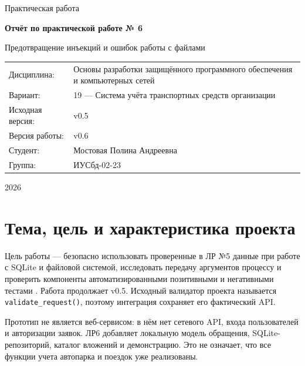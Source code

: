 \documentclass[12pt,a4paper]{article}
\begin{document}
\begin{titlepage}
\centering
{\large Практическая работа\par}
\vspace{2.2cm}
{\LARGE\bfseries Отчёт по практической работе № 6\par}
\vspace{0.6cm}
{\Large Предотвращение инъекций и ошибок работы с файлами\par}
\vspace{1.8cm}
\begin{tabular}{p{4cm}p{11cm}}
Дисциплина: & Основы разработки защищённого программного обеспечения и компьютерных сетей\\
Вариант: & 19 — Система учёта транспортных средств организации\\
Исходная версия: & v0.5\\
Версия работы: & v0.6\\
Студент: & Мостовая Полина Андреевна\\
Группа: & ИУСбд-02-23
\end{tabular}
\vfill
{\large 2026\par}
\end{titlepage}
\tableofcontents
\clearpage

\section{Тема, цель и характеристика проекта}
Цель работы — безопасно использовать проверенные в ЛР №5 данные при работе с SQLite и файловой системой, исследовать передачу аргументов процессу и проверить компоненты автоматизированными позитивными и негативными тестами \cite{guide6}. Работа продолжает v0.5. Исходный валидатор проекта называется \texttt{validate\_request()}, поэтому интеграция сохраняет его фактический API.

Прототип не является веб-сервисом: в нём нет сетевого API, входа пользователей и авторизации заявок. ЛР6 добавляет локальную модель обращения, SQLite-репозиторий, каталог вложений и демонстрацию. Это не означает, что все функции учета автопарка и поездок уже реализованы.
\end{document}

